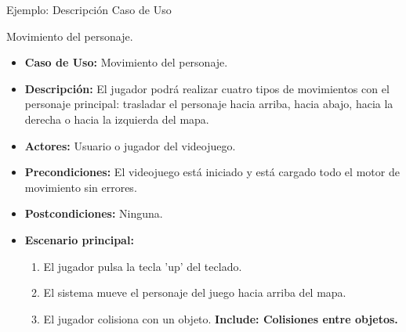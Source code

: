 \documentclass[9pt,xcolor=svgnames]{beamer}
\begin{document}
  
  
  \begin{frame}{Ejemplo: Descripción Caso de Uso}
   
   Movimiento del personaje.
   
   \begin{itemize}
    \item \textbf{Caso de Uso:} Movimiento del personaje.
    \item \textbf{Descripción:} El jugador podrá realizar cuatro tipos de
	  movimientos con el personaje principal: trasladar el personaje
	  hacia arriba, hacia abajo, hacia la derecha o hacia la
	  izquierda del mapa.
    \item \textbf{Actores:} Usuario o jugador del videojuego.
    \item \textbf{Precondiciones:} El videojuego está iniciado y está
	  cargado todo el motor de movimiento sin errores.
    \item \textbf{Postcondiciones:} Ninguna.
    \item \textbf{Escenario principal:} \\
	  
	  \begin{enumerate}
	   \item El jugador pulsa la tecla 'up' del teclado.
	   \item El sistema mueve el personaje del juego hacia arriba
		 del mapa.
	   \item El jugador colisiona con un objeto. \textbf{Include:
		 Colisiones entre objetos.}
	  \end{enumerate}
   \end{itemize}
  \end{frame}
  
\end{document}
